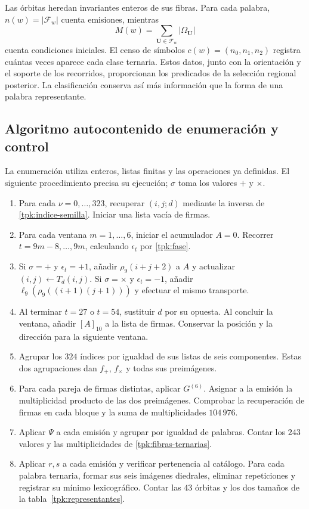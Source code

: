 Las órbitas heredan invariantes enteros de sus fibras. Para cada palabra,
\(n(w)=|\mathcal F_w|\) cuenta emisiones, mientras
\[
 M(w)=\sum_{\mathbf U\in\mathcal F_w}|\Omega_{\mathbf U}|
\]
cuenta condiciones iniciales. El censo de símbolos
\(c(w)=(n_0,n_1,n_2)\) registra cuántas veces aparece cada clase ternaria.
Estos datos, junto con la orientación y el soporte de los recorridos,
proporcionan los predicados de la selección regional posterior. La
clasificación conserva así más información que la forma de una palabra
representante.

\subsection{Algoritmo autocontenido de enumeración y control}
\label{tpk:algoritmo}

La enumeración utiliza enteros, listas finitas y las operaciones ya definidas.
El siguiente procedimiento precisa su ejecución; \(\sigma\) toma los valores
\(+\) y \(\times\).

\begin{enumerate}
\item Para cada \(\nu=0,\ldots,323\), recuperar \((i,j;d)\) mediante
la inversa de \eqref{tpk:indice-semilla}. Iniciar una lista vacía de firmas.
\item Para cada ventana \(m=1,\ldots,6\), iniciar el acumulador \(A=0\).
Recorrer \(t=9m-8,\ldots,9m\), calculando \(\epsilon_t\) por
\eqref{tpk:fase}.
\item Si \(\sigma=+\) y \(\epsilon_t=+1\), añadir
\(\rho_9(i+j+2)\) a \(A\) y actualizar
\((i,j)\leftarrow T_d(i,j)\). Si \(\sigma=\times\) y
\(\epsilon_t=-1\), añadir
\(\ell_9(\rho_9((i+1)(j+1)))\) y efectuar el mismo transporte.
\item Al terminar \(t=27\) o \(t=54\), sustituir \(d\) por su opuesta.
Al concluir la ventana, añadir \([A]_{10}\) a la lista de firmas.
Conservar la posición y la dirección para la siguiente ventana.
\item Agrupar los \(324\) índices por igualdad de sus listas de seis
componentes. Estas dos agrupaciones dan \(f_+\), \(f_\times\) y todas
sus preimágenes.
\item Para cada pareja de firmas distintas, aplicar \(G^{(6)}\).
Asignar a la emisión la multiplicidad producto de las dos preimágenes.
Comprobar la recuperación de firmas en cada bloque y la suma de
multiplicidades \(104\,976\).
\item Aplicar \(\Psi\) a cada emisión y agrupar por igualdad de palabras.
Contar los \(243\) valores y las multiplicidades de
\eqref{tpk:fibras-ternarias}.
\item Aplicar \(r,s\) a cada emisión y verificar pertenencia al catálogo.
Para cada palabra ternaria, formar sus seis imágenes diedrales, eliminar
repeticiones y registrar su mínimo lexicográfico. Contar las \(43\)
órbitas y los dos tamaños de la tabla~\ref{tpk:representantes}.
\end{enumerate}

